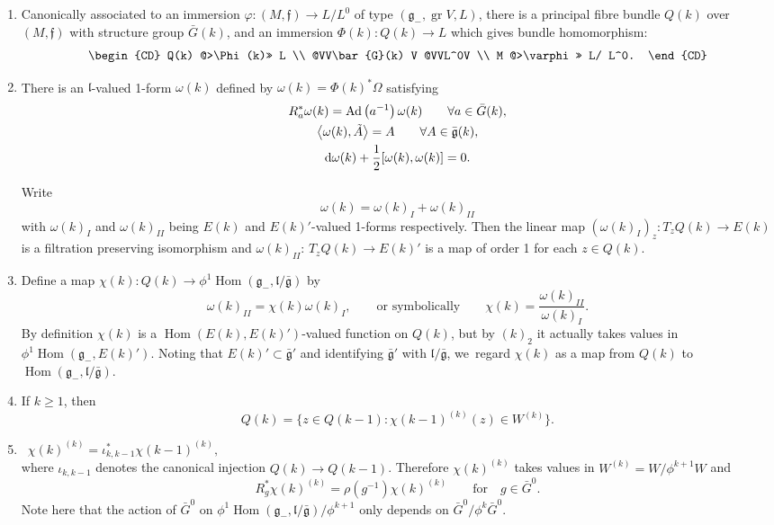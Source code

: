 \documentclass[10pt,a4paper]{amsart}
\newcommand{\geneg}{\mathfrak g _-}
\newcommand{\gebar}{\bar{\mathfrak g}}
\newcommand{\f}{\mathfrak f}
\newcommand{\lf}{\mathfrak l}
\newcommand{\gr}{\operatorname{gr}}
\newcommand{\Hom}{\operatorname{Hom}}
\numberwithin{equation}{section}
\begin{document}
\begin{enumerate}\itemsep=0pt
\item[$(k)_1$] Canonically associated to an immersion
$\varphi\colon (M, \f ) \to L/L^0 $ of type $(\geneg,\gr V, L)$,
there is a principal fibre bundle $Q(k)$ over $(M, \f) $ with structure group $\bar{G} (k)$,
and an immersion $\Phi(k)\colon Q(k) \to L$ which gives bundle
homomorphism:
\[
\begin{CD}
Q(k) @>\Phi(k)>> L \\
@VV\bar{G}(k) V @VVL^0V \\
M @>\varphi>> L/ L^0.
\end{CD}
\]

\item[$(k)_2$]
There is an $\lf$-valued 1-form $\omega(k) $ defined by
$\omega (k) = \Phi(k)^* \Omega$ satisfying
\begin{gather*}
R_a ^* \omega(k) = {\rm Ad}\left(a^{-1}\right)\omega (k) \qquad \forall a \in \bar{G}(k),
\\
\big\langle \omega (k) , \tilde{A} \big\rangle = A \qquad \forall A \in \gebar(k),
\\
{\rm d}\omega(k) + \frac12 [ \omega(k) , \omega(k) ] = 0.
\end{gather*}

Write
\[
 \omega (k) = \omega (k)_I + \omega(k)_{II}
\]
with $\omega (k) _I $ and $\omega(k)_{II}$ being $E(k) $ and $E(k)'$-valued 1-forms
respectively. Then the li\-near map
$\left(\omega(k)_I \right)_z\colon T_z Q(k) \to E(k) $ is a filtration preserving isomorphism
and $\omega(k) _{II}$: $T_z Q(k) \to E(k)' $ is a map of order 1
for each $z \in Q(k)$.

\item[$(k)_3$]
Define a map $\chi(k)\colon Q(k) \to \phi^1\Hom(\geneg, \lf/\gebar)$ by
\[
\omega(k)_{II} = \chi (k) \omega(k)_I, \qquad \text{or symbolically}\qquad
\chi(k) = \frac {\omega(k)_{II}}{\omega(k)_I}.
\]
By definition $\chi(k)$ is a $\Hom(E(k), E(k)')$-valued function
on $Q(k)$, but by $(k)_2$ it actually takes values in
$\phi^1\Hom (\geneg, E(k)')$. Noting that $E(k)' \subset \gebar '$ and identifying $\gebar '$ with $\lf / \gebar $, we~regard $\chi(k)$ as a map from $Q(k)$ to $\Hom( \geneg, \lf/\gebar)$.

\item[$(k)_4$]
If $k \ge 1$, then
\[
Q(k) = \big\{ z \in Q(k-1)\colon \chi (k-1) ^{(k)} (z) \in W^{(k)} \big\}.
\]

\item[$(k)_5 $]
\qquad\ $\chi(k) ^{(k)} = \iota _{k, k-1} ^* \chi(k-1) ^{(k)}, $ \\
where $\iota_{k, k-1}$ denotes the canonical injection
$ Q(k) \to Q(k-1) $.
Therefore
$\chi (k) ^{(k)}$ takes values in $W^{(k)} = W / \phi^{k+1} W$
and
\[
R_g^* \chi(k) ^{(k)} = \rho \left(g^{-1}\right)\chi(k) ^{(k)}
\qquad \text{for}\quad g \in \bar{G}^0.
\]
Note here that the action
of $\bar{G}^0$ on $\phi^1\Hom(\geneg, \lf/\gebar) / \phi^{k+1}$ only depends on $\bar{G}^0/\phi^{k}\bar{G}^0$.


\end{enumerate}
\end{document}
